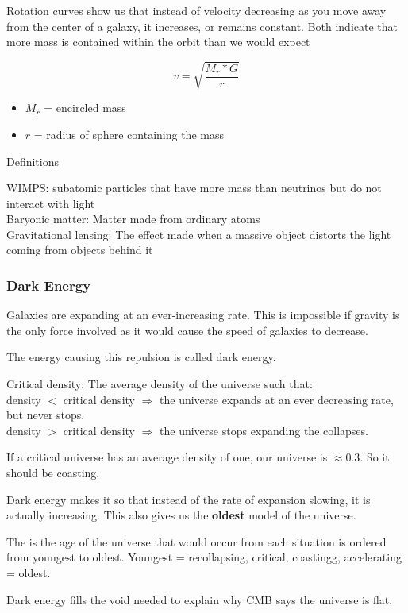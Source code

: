 Rotation curves show us that instead of velocity decreasing as you move away from the center of a galaxy, it increases, or remains constant.  Both indicate that more mass is contained within the orbit than we would expect

$$v = \sqrt{\frac{M_r * G}{r}}$$
\begin{itemize}
    \item $M_r$ = encircled mass
    \item $r$ = radius of sphere containing the mass
\end{itemize}

Definitions

WIMPS: subatomic particles that have more mass than neutrinos but do not interact with light \\
Baryonic matter: Matter made from ordinary atoms \\
Gravitational lensing: The effect made when a massive object distorts the light coming from objects behind it

\subsubsection{Dark Energy}
Galaxies are expanding at an ever-increasing rate.  This is impossible if gravity is the only force involved as it would cause the speed of galaxies to decrease.

The energy causing this repulsion is called dark energy.

Critical density: The average density of the universe such that: \\
density $<$ critical density $\Rightarrow$ the universe expands at an ever decreasing rate, but never stops. \\
density $>$ critical density $\Rightarrow$ the universe stops expanding the collapses.

If a critical universe has an average density of one, our universe is $\approx 0.3$.  So it should be coasting.

Dark energy makes it so that instead of the rate of expansion slowing, it is actually increasing.  This also gives us the \textbf{oldest} model of the universe.

The is the age of the universe that would occur from each situation is ordered from youngest to oldest.  Youngest = recollapsing, critical, coastingg, accelerating = oldest.

Dark energy fills the void needed to explain why CMB says the universe is flat.

